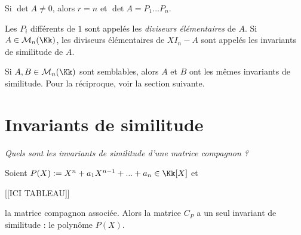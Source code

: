\documentclass[class=report,crop=false]{standalone}
\begin{document}
\begin{remarque*}
Si $\det A \neq 0$, alors $r = n$ et $\det A = P_1...P_n$.
\end{remarque*}

\begin{definition}
Les $P_i$ différents de $1$ sont appelés les {\it diviseurs élémentaires} de $A$. Si $A \in \mathcal{M}_n(\Kk)$, les diviseurs élémentaires de $XI_n-A$ sont appelés les {invariants de similitude}  de $A$.
\end{definition}

\begin{exercicecours}
Si $A,B \in \mathcal{M}_n(\Kk)$ sont semblables, alors $A$ et $B$ ont les mêmes invariants de similitude. Pour la réciproque, voir la section suivante.
\end{exercicecours}

\section{Invariants de similitude}

{\it Quels sont les invariants de similitude d'une matrice compagnon ?}

\begin{lemme}
Soient 
$P(X) := X^n+a_1X^{n-1}+...+a_n \in \Kk[X]$ et 


[[ICI TABLEAU]]

la matrice compagnon associée. Alors la matrice $C_P$ a un seul invariant de similitude : le polynôme $P(X)$.
\end{lemme}
\end{document}
